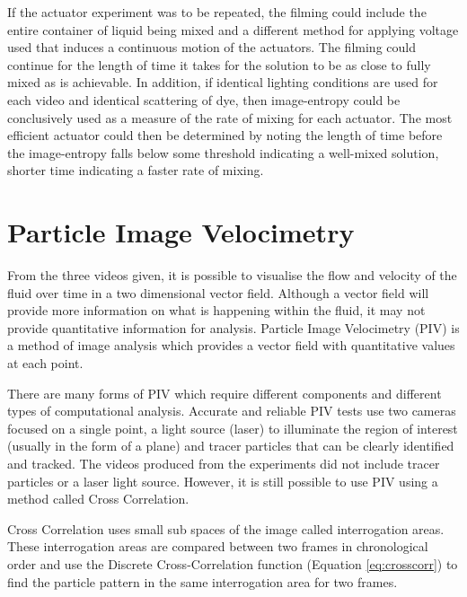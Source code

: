If the actuator experiment was to be repeated, the filming could include the entire container of liquid being mixed and a different method for applying voltage used that induces a continuous motion of the actuators. The filming could continue for the length of time it takes for the solution to be as close to fully mixed as is achievable. In addition, if identical lighting conditions are used for each video and identical scattering of dye, then image-entropy could be conclusively used as a measure of the rate of mixing for each actuator. The most efficient actuator could then be determined by noting the length of time before the image-entropy falls below some threshold indicating a well-mixed solution, shorter time indicating a faster rate of mixing.
  



\section{Particle Image Velocimetry}
\label{sec:PIV}



From the three videos given, it is possible to visualise the flow and velocity of the fluid over time in a two dimensional vector field. Although a vector field will provide more information on what is happening within the fluid, it may not provide quantitative information for analysis. Particle Image Velocimetry (PIV) is a method of image analysis which provides a vector field with quantitative values at each point.

There are many forms of PIV which require different components and different types of computational analysis. Accurate and reliable PIV tests use two cameras focused on a single point, a light source (laser) to illuminate the region of interest (usually in the form of a plane) and tracer particles that can be clearly identified and tracked. The videos produced from the experiments did not include tracer particles or a laser light source. However, it is still possible to use PIV using a method called Cross Correlation.

Cross Correlation uses small sub spaces of the image called interrogation areas. These interrogation areas are compared between two frames in chronological order and use the Discrete Cross-Correlation function (Equation \ref{eq:crosscorr})\cite{flappybird} to find the particle pattern in the same interrogation area for two frames.

